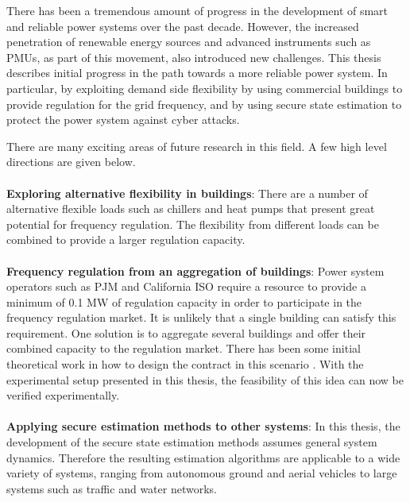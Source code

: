 \documentclass[../thesis.tex]{subfiles}
\begin{document}
There has been a tremendous amount of progress in the development of smart and reliable power systems over the past decade. 
However, the increased penetration of renewable energy sources and advanced instruments such as PMUs, as part of this movement, also introduced new challenges. 
This thesis describes initial progress in the path towards a more reliable power system.
In particular, by exploiting demand side flexibility by using commercial buildings to provide regulation for the grid frequency, and by using secure state estimation to protect the power system against cyber attacks.

There are many exciting areas of future research in this field. A few high level directions are given below.\\
\\
\textbf{Exploring alternative flexibility in buildings}: %
There are a number of alternative flexible loads such as chillers and heat pumps that present great potential for frequency regulation. The flexibility from different loads can be combined to provide a larger regulation capacity.\\
\\
\textbf{Frequency regulation from an aggregation of buildings}: Power system operators such as PJM and California ISO require a resource to provide a minimum of 0.1 MW of regulation capacity in order to participate in the frequency regulation market. It is unlikely that a single building can satisfy this requirement. One solution is to aggregate several buildings and offer their combined capacity to the regulation market. There has been some initial theoretical work in how to design the contract in this scenario \cite{Balandat:2014contractdesign}. With the experimental setup presented in this thesis, the feasibility of this idea can now be verified experimentally.\\
\\
\textbf{Applying secure estimation methods to other systems}: In this thesis, the development of the secure state estimation methods assumes general system dynamics. Therefore the resulting estimation algorithms are applicable to a wide variety of systems, ranging from autonomous ground and aerial vehicles to large systems such as traffic and water networks.\\
\end{document}
